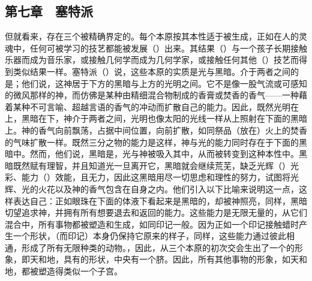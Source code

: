 
\subsection{第七章　塞特派}

但就看来，存在三个被精确界定的。每个本原按其本性适于被生成，正如在人的灵魂中，任何可被学习的技艺都能被发展（）出来。其结果（）与一个孩子长期接触乐器而成为音乐家，或接触几何学而成为几何学家，或接触任何其他（）技艺而得到类似结果一样。塞特派（）说，这些本原的实质是光与黑暗。介于两者之间的是；他们说，这神居于下方的黑暗与上方的光明之间。它不是像一股气流或可感知的微风那样的神，而仿佛是某种由精细混合物制成的香膏或焚香的香气——一种藉着某种不可言喻、超越言语的香气的冲动而扩散自己的能力。因此，既然光明在上，黑暗在下，神介于两者之间，光明也像太阳的光线一样从上照射在下面的黑暗上。神的香气向前飘荡，占据中间位置，向前扩散，如同祭品（放在）火上的焚香的气味扩散一样。既然三分之物的能力是这样，神与光的能力同时存在于下面的黑暗中。然而，他们说，黑暗是，光与神被吸入其中，从而被转变到这种本性中。黑暗既然赋有理智，并且知道光一旦离开它，黑暗就会继续荒芜，缺乏光辉（）光彩、能力（）效能，且无力，因此这黑暗用尽一切思虑和理性的努力，试图将光辉、光的火花以及神的香气包含在自身之内。他们引入以下比喻来说明这一点，这样表达自己：正如眼珠在下面的体液下看起来是黑暗的，却被神照亮，同样，黑暗切望追求神，并拥有所有想要退去和返回的能力。这些能力是无限无量的，从它们混合中，所有事物都被塑造和生成，如同印记一般。因为正如一个印记接触蜡时产生一个形状，（而印记）本身仍保持它原来的样子，同样，这些能力通过彼此相通，形成了所有无限种类的动物。，因此，从三个本原的初次交会生出了一个的形象，即天和地，具有的形状，中央有一个脐。因此，所有其他事物的形象，如天和地，都被塑造得类似一个子宫。\par

